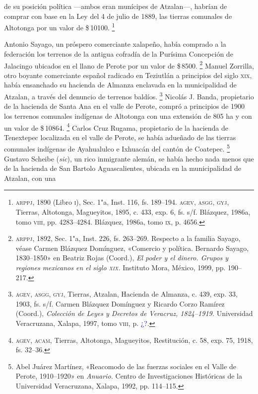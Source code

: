 \documentclass[14pt,twoside,final]{extbook} %
\let\oldfootnote\footnote
\renewcommand\footnote[1]{%
\oldfootnote{\hspace{1mm}#1}}
\begin{document}
de su posición política ---ambos eran munícipes de Atzalan---, habrían de comprar con base en la Ley del 4 de julio de 1889, las tierras comunales de Altotonga por un valor de \$\,10100.\footnote{\textsc{arppj}, 1890 (Libro \textsc{i}), Sec. 1"a, Inst. 116, fs. 189--194. \textsc{agev, asgg, gyj}, Tierras, Altotonga, Magueyitos, 1895, c. 433, exp. 6, fs. s/f. Blázquez, 1986a, tomo \textsc{viii}, pp. 4283--4284. Blázquez, 1986a, tomo \textsc{ix}, p. 4656.}

Antonio Sayago, un próspero comerciante xalapeño, había comprado a la federación los terrenos de la antigua cofradía de la Purísima Concepción de Jalacingo ubicados en el llano de Perote por un valor de \$\,8500.\footnote{\textsc{arppj}, 1892, Sec. 1"a, Inst. 226, fs. 263--269. Respecto a la familia Sayago,\index[nombres]{Sayago!familia} véase Carmen Blázquez Domínguez, «Comercio y política. Bernardo Sayago, 1830--1850» en Beatriz Rojas (Coord.), \emph{El poder y el dinero. Grupos y regiones mexicanos en el siglo \textsc{xix}.} Instituto Mora, México, 1999, pp. 190--217.} Manuel Zorrilla, otro boyante comerciante español radicado en Teziutlán a principios del siglo \textsc{xix}, había ensanchado su hacienda de Almanza enclavada en la municipalidad de Atzalan, a través del denuncio de terrenos baldíos.\footnote{\textsc{agev, asgg, gyj}, Tierras, Atzalan, Hacienda de Almanza, c. 439, exp. 33, 1903, fs. s/f. Carmen Blázquez Domínguez y Ricardo Corzo Ramírez (Coord.), \emph{Colección de Leyes y Decretos de Veracruz, 1824--1919.} Universidad Veracruzana, Xalapa, 1997, tomo \textsc{viii}, p. \textcolor{blue}{¿?}.} Nicolás J. Banda, propietario de la hacienda de Santa Ana en el valle de Perote, compró a principios de 1900 los terrenos comunales indígenas de Altotonga con una extensión de 805 ha y con un valor de \$\,10864.\footnote{\textsc{agev, acam}, Tierras, Altotonga, Magueyitos, Restitución, c. 58, exp. 75, 1918, fs. 32--36.} Carlos Cruz Rugama, propietario de la hacienda de Tenextepec localizada en el valle de Perote, se había adueñado de las tierras comunales indígenas de Ayahualulco e Ixhuacán del cantón de Coatepec.\footnote{Abel Juárez Martínez, «Reacomodo de las fuerzas sociales en el Valle de Perote, 1910--1920» en \textit{Anuario.} Centro de Investigaciones Históricas de la Universidad Veracruzana, Xalapa, 1992, pp. 114--115.} Gustavo Scheibe (\emph{sic}), un rico inmigrante alemán, se había hecho nada menos que de la hacienda de San Bartolo Aguascalientes, ubicada en la municipalidad de Atzalan, con una 
\end{document}
